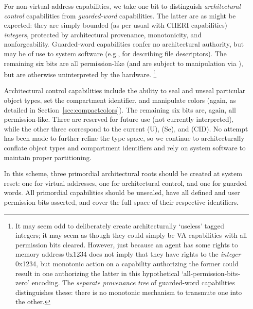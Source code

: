 For non-virtual-address capabilities, we take one bit to distinguish
\emph{architectural control} capabilities from \emph{guarded-word}
capabilities.  The latter are as might be expected: they are simply bounded (as
per usual with CHERI capabilities) \emph{integers}, protected by architectural
provenance, monotonicity, and nonforgeability.  Guarded-word capabilities confer
no architectural authority, but may be of use to system software (e.g., for
describing file descriptors).  The remaining six bits are all permission-like
(and are subject to manipulation via ), but are
otherwise uninterpreted by the hardware.%
%
\footnote{It may seem odd to deliberately create architecturally `useless'
tagged integers; it may seem as though they could simply be VA capabilities
with all permission bits cleared.  However, just because an agent has some
rights to memory address 0x1234 does not imply that they have rights to the
\emph{integer} 0x1234, but monotonic action on a capability authorizing the
former could result in one authorizing the latter in this hypothetical
`all-permission-bits-zero' encoding.  The \emph{separate provenance tree}
of guarded-word capabilities distinguishes these: there is no monotonic
mechanism to transmute one into the other.}

Architectural control capabilities include the ability to seal and unseal
particular object types, set the compartment identifier, and manipulate colors
(again, as detailed in Section~\ref{sec:compactcolors}).  The remaining
six bits are, again, all permission-like.  Three are reserved for future use
(not currently interpreted), while the other three correspond to the current
\cappermUnseal (U), \cappermSeal (Se), and \cappermCid (CID).  No attempt
has been made to further refine the type space, so we continue to
architecturally conflate object types and compartment identifiers and rely on
system software to maintain proper partitioning.

In this scheme, three primordial architectural roots should be created at
system reset: one for virtual addresses, one for architectural control, and
one for guarded words.  All primordial capabilities should be unsealed, have
all defined and user permission bits asserted, and cover the full space of
their respective identifiers.


